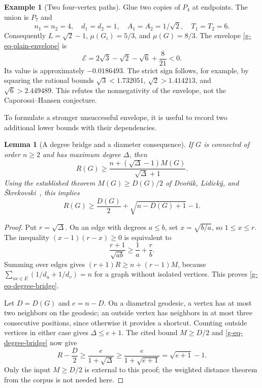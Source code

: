 \documentclass[11pt,a4paper]{article}
\newtheorem{lemma}[theorem]{Lemma}
\theoremstyle{definition}
\newtheorem{example}[theorem]{Example}
\theoremstyle{remark}
\begin{document}
\begin{example}[Two four-vertex paths]
\label{g-ex-P4-gluing}
Glue two copies of $P_4$ at endpoints.  The union is $P_7$ and
\[
 n_1=n_2=4,\quad d_1=d_2=1,\quad A_1=A_2=1/\sqrt2,
 \quad T_1=T_2=6.
\]
Consequently $L=\sqrt2-1$, $\mu(G_i)=5/3$, and $\mu(G)=8/3$.
The envelope \eqref{g-eq-plain-envelope} is
\begin{equation}
 \mathcal E=2\sqrt3-\sqrt2-\sqrt6+\frac8{21}<0.
 \label{g-eq-P4-negative}
\end{equation}
Its value is approximately $-0.0186493$.  The strict sign follows, for
example, by squaring the rational bounds
$\sqrt3<1.732051$, $\sqrt2>1.414213$, and
$\sqrt6>2.449489$.  This refutes the nonnegativity of the envelope, not
the Caporossi--Hansen conjecture.
\end{example}

To formulate a stronger unsuccessful envelope, it is useful to record
two additional lower bounds with their dependencies.

\begin{lemma}[A degree bridge and a diameter consequence]
\label{g-lem-degree-bridge}
If $G$ is connected of order $n\ge2$ and has maximum degree $\Delta$, then
\begin{equation}
 R(G)\ge
 \frac{n+(\sqrt\Delta-1)M(G)}{\sqrt\Delta+1}.
 \label{g-eq-degree-bridge}
\end{equation}
Using the established theorem $M(G)\ge D(G)/2$ of
Dvo\v r\'ak, Lidick\'y, and \v Skrekovski~\cite{g-DLS2011}, this implies
\begin{equation}
 R(G)\ge\frac{D(G)}2+\sqrt{n-D(G)+1}-1.
 \label{g-eq-diameter-bridge}
\end{equation}
\end{lemma}

\begin{proof}
Put $r=\sqrt\Delta$.  On an edge with degrees $a\le b$, set
$x=\sqrt{b/a}$, so $1\le x\le r$.  The inequality
$(x-1)(r-x)\ge0$ is equivalent to
\[
 \frac{r+1}{\sqrt{ab}}\ge\frac1a+\frac r b.
\]
Summing over edges gives $(r+1)R\ge n+(r-1)M$, because
$\sum_{uv\in E}(1/d_u+1/d_v)=n$ for a graph without isolated vertices.
This proves \eqref{g-eq-degree-bridge}.

Let $D=D(G)$ and $e=n-D$.  On a diametral geodesic, a vertex has at most
two neighbors on the geodesic; an outside vertex has neighbors in at most
three consecutive positions, since otherwise it provides a shortcut.
Counting outside vertices in either case gives $\Delta\le e+1$.
The cited bound $M\ge D/2$ and \eqref{g-eq-degree-bridge} now give
\[
 R-\frac D2\ge\frac{e}{1+\sqrt\Delta}
 \ge\frac e{1+\sqrt{e+1}}=\sqrt{e+1}-1.
\]
Only the input $M\ge D/2$ is external to this proof; the weighted
distance theorem from the corpus is not needed here.
\end{proof}
\end{document}
